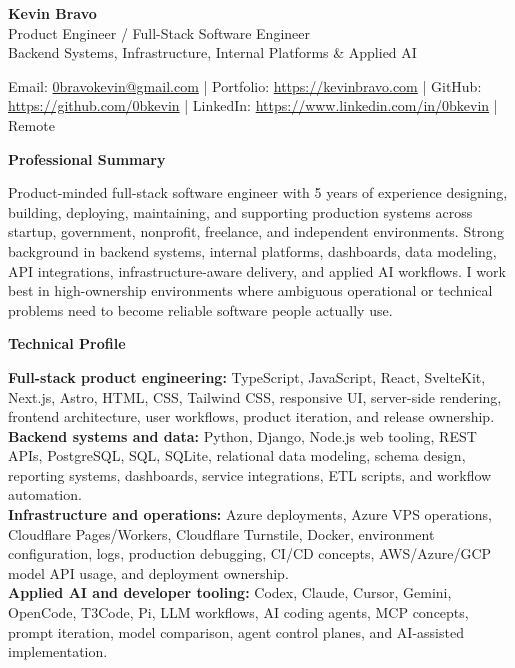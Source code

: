 \documentclass[10pt]{article}
\newcommand{\sectiontitle}[1]{%
    \vspace{5pt}
    \begin{center}
        \textbf{#1}
    \end{center}
    \vspace{-6pt}
}
\begin{document}
\raggedright

\begin{center}
    {\LARGE \textbf{Kevin Bravo}}\\
    Product Engineer / Full-Stack Software Engineer \\
    Backend Systems, Infrastructure, Internal Platforms \& Applied AI \\
    \hrulefill
\end{center}

\begin{center}
    Email: \href{mailto:0bravokevin@gmail.com}{0bravokevin@gmail.com}
    | Portfolio: \href{https://kevinbravo.com}{https://kevinbravo.com}
    | GitHub: \href{https://github.com/0bkevin}{https://github.com/0bkevin}
    | LinkedIn: \href{https://www.linkedin.com/in/0bkevin/}{https://www.linkedin.com/in/0bkevin}
    | Remote
\end{center}

\sectiontitle{Professional Summary}
Product-minded full-stack software engineer with 5 years of experience designing, building, deploying, maintaining, and supporting production systems across startup, government, nonprofit, freelance, and independent environments. Strong background in backend systems, internal platforms, dashboards, data modeling, API integrations, infrastructure-aware delivery, and applied AI workflows. I work best in high-ownership environments where ambiguous operational or technical problems need to become reliable software people actually use.

\sectiontitle{Technical Profile}
\textbf{Full-stack product engineering:} TypeScript, JavaScript, React, SvelteKit, Next.js, Astro, HTML, CSS, Tailwind CSS, responsive UI, server-side rendering, frontend architecture, user workflows, product iteration, and release ownership. \\
\textbf{Backend systems and data:} Python, Django, Node.js web tooling, REST APIs, PostgreSQL, SQL, SQLite, relational data modeling, schema design, reporting systems, dashboards, service integrations, ETL scripts, and workflow automation. \\
\textbf{Infrastructure and operations:} Azure deployments, Azure VPS operations, Cloudflare Pages/Workers, Cloudflare Turnstile, Docker, environment configuration, logs, production debugging, CI/CD concepts, AWS/Azure/GCP model API usage, and deployment ownership. \\
\textbf{Applied AI and developer tooling:} Codex, Claude, Cursor, Gemini, OpenCode, T3Code, Pi, LLM workflows, AI coding agents, MCP concepts, prompt iteration, model comparison, agent control planes, and AI-assisted implementation.
\end{document}
